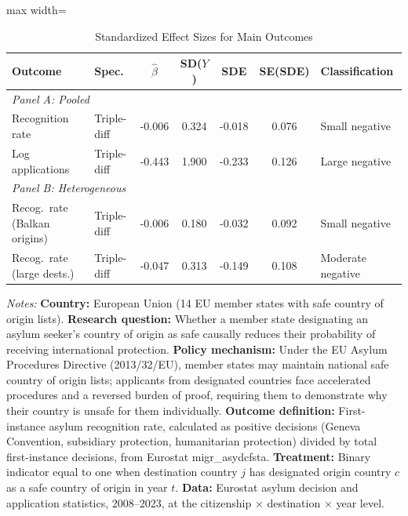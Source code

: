 \begin{table}[H]
\centering
\caption{Standardized Effect Sizes for Main Outcomes}
\label{tab:sde}
\begin{threeparttable}
\footnotesize
\begin{adjustbox}{max width=\textwidth}
\begin{tabular}{llccccl}
\toprule
Outcome & Spec. & $\hat{\beta}$ & SD($Y$) & SDE & SE(SDE) & Classification \\
\midrule
\multicolumn{6}{l}{\textit{Panel A: Pooled}} \\
Recognition rate & Triple-diff & -0.006 & 0.324 & -0.018 & 0.076 & Small negative \\
Log applications & Triple-diff & -0.443 & 1.900 & -0.233 & 0.126 & Large negative \\
\midrule
\multicolumn{6}{l}{\textit{Panel B: Heterogeneous}} \\
Recog.\ rate (Balkan origins) & Triple-diff & -0.006 & 0.180 & -0.032 & 0.092 & Small negative \\
Recog.\ rate (large dests.) & Triple-diff & -0.047 & 0.313 & -0.149 & 0.108 & Moderate negative \\
\bottomrule
\end{tabular}
\end{adjustbox}
\begin{tablenotes}[flushleft]
\footnotesize
\item \textit{Notes:}
\textbf{Country:} European Union (14 EU member states with safe country of origin lists).
\textbf{Research question:} Whether a member state designating an asylum seeker's country of origin as safe causally reduces their probability of receiving international protection.
\textbf{Policy mechanism:} Under the EU Asylum Procedures Directive (2013/32/EU), member states may maintain national safe country of origin lists; applicants from designated countries face accelerated procedures and a reversed burden of proof, requiring them to demonstrate why their country is unsafe for them individually.
\textbf{Outcome definition:} First-instance asylum recognition rate, calculated as positive decisions (Geneva Convention, subsidiary protection, humanitarian protection) divided by total first-instance decisions, from Eurostat migr\_asydcfsta.
\textbf{Treatment:} Binary indicator equal to one when destination country $j$ has designated origin country $c$ as a safe country of origin in year $t$.
\textbf{Data:} Eurostat asylum decision and application statistics, 2008--2023, at the citizenship $\times$ destination $\times$ year level.

\end{tablenotes}
\end{threeparttable}
\end{table}
